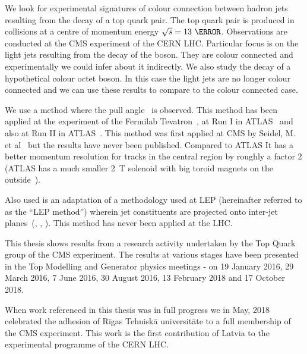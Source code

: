 We look for experimental signatures of colour connection between hadron jets resulting from the decay of a top quark pair. The top quark pair is produced in \Pp\Pp collisions at a centre of momentum energy $\sqrt{s}=13~\TeV$. Observations are conducted at the CMS experiment of the CERN LHC. Particular focus is on the light jets resulting from the decay of the \PW boson. They are colour connected and experimentally we could infer about it indirectly. We also study the decay of a hypothetical colour octet \PW boson. In this case the light jets are no longer colour connected and we can use these results to compare to the colour connected case. 

We use a method where the pull angle~\cite{Gallicchio:2010sw} is observed. This method has been applied at the \DZERO experiment of the Fermilab Tevatron~\cite{Abazov:2011vh}, at Run I in ATLAS~\cite{Aad:2015lxa} and also at Run II in ATLAS~\cite{Aaboud:2018ibj}. This method was first applied at CMS by Seidel, M. et al~\cite{indico:Markus_cf} but the results have never been published. Compared to ATLAS It has a better momentum resolution for tracks in the central region by roughly a factor 2 (ATLAS has a much smaller 2~T solenoid with big toroid magnets on the outside~\cite{Aad:2008zzm}).

Also used is an adaptation of a methodology used at LEP (hereinafter referred to as the ``LEP method'') wherein jet constituents are projected onto inter-jet planes~(\cite{Abbiendi:2005es}, \cite{Abdallah:2006uq}, \cite{Achard:2003pe}). This method has never been applied at the LHC.

This thesis shows results from a research activity undertaken by the Top Quark group of the CMS experiment. The results at various stages have been presented in the Top Modelling and Generator physics meetings - on 19 January 2016, 29 March 2016, 7 June 2016, 30 August 2016, 13 February 2018 and 17 October 2018.

When work referenced in this thesis was in full progress we in May, 2018 celebrated the adhesion of Rīgas Tehniskā universitāte to a full membership of the CMS experiment. This work is the first contribution of Latvia to the experimental programme of the CERN LHC.
